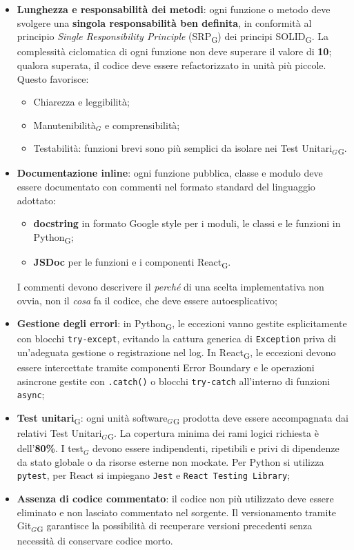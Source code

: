 \documentclass[a4paper, 10pt]{article}
\begin{document}
\begin{itemize}
    \item \textbf{Lunghezza e responsabilità dei metodi}: ogni funzione o metodo deve svolgere una \textbf{singola responsabilità ben definita}, in conformità al principio \textit{Single Responsibility Principle} (SRP\textsubscript{G}) dei principi SOLID\textsubscript{G}. La complessità ciclomatica di ogni funzione non deve superare il valore di \textbf{10}; qualora superata, il codice deve essere refactorizzato in unità più piccole. Questo favorisce:
    \begin{itemize}
        \item Chiarezza e leggibilità;
        \item Manutenibilità$_G$ e comprensibilità;
        \item Testabilità: funzioni brevi sono più semplici da isolare nei Test Unitari$_G$\textsubscript{G}.
    \end{itemize}

    \item \textbf{Documentazione inline}: ogni funzione pubblica, classe e modulo deve essere documentato con commenti nel formato standard del linguaggio adottato:
    \begin{itemize}
        \item \textbf{docstring} in formato Google style per i moduli, le classi e le funzioni in Python\textsubscript{G};
        \item \textbf{JSDoc} per le funzioni e i componenti React\textsubscript{G}.
    \end{itemize}
    I commenti devono descrivere il \textit{perché} di una scelta implementativa non ovvia, non il \textit{cosa} fa il codice, che deve essere autoesplicativo;

    \item \textbf{Gestione degli errori}: in Python\textsubscript{G}, le eccezioni vanno gestite esplicitamente con blocchi \texttt{try-except}, evitando la cattura generica di \texttt{Exception} priva di un'adeguata gestione o registrazione nel log. In React\textsubscript{G}, le eccezioni devono essere intercettate tramite componenti Error Boundary e le operazioni asincrone gestite con \texttt{.catch()} o blocchi \texttt{try-catch} all'interno di funzioni \texttt{async};

    \item \textbf{Test unitari}\textsubscript{G}: ogni unità software$_G$\textsubscript{G} prodotta deve essere accompagnata dai relativi Test Unitari$_G$\textsubscript{G}. La copertura minima dei rami logici richiesta è dell'\textbf{80\%}. I test$_G$ devono essere indipendenti, ripetibili e privi di dipendenze da stato globale o da risorse esterne non mockate. Per Python si utilizza \texttt{pytest}, per React si impiegano \texttt{Jest} e \texttt{React Testing Library};

    \item \textbf{Assenza di codice commentato}: il codice non più utilizzato deve essere eliminato e non lasciato commentato nel sorgente. Il versionamento tramite Git$_G$\textsubscript{G} garantisce la possibilità di recuperare versioni precedenti senza necessità di conservare codice morto.
\end{itemize}
\end{document}
